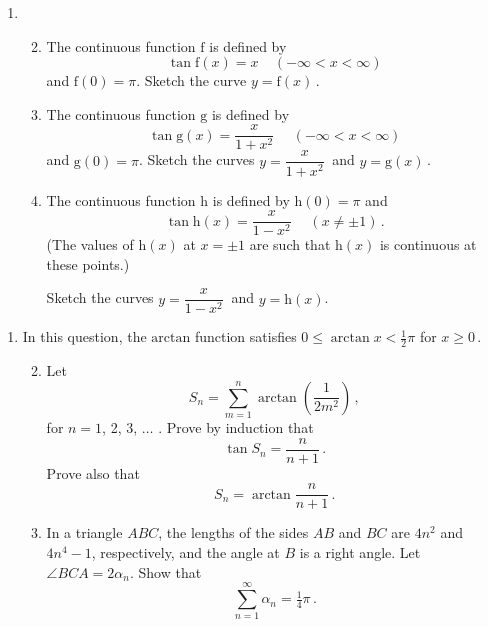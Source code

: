 \documentclass[a4, 11pt]{report}
\newlength{\qspace}
\newcounter{qnumber}
\newenvironment{question}%
 {\vspace{\qspace}
  \begin{enumerate}[\bfseries 1\quad][10]%
    \setcounter{enumi}{\value{qnumber}}%
    \item%
 }
{
  \end{enumerate}
  \filbreak
  \stepcounter{qnumber}
 }
\newenvironment{questionparts}[1][1]%
 {
  \begin{enumerate}[\bfseries (i)]%
    \setcounter{enumii}{#1}
    \addtocounter{enumii}{-1}
    \setlength{\itemsep}{5mm}
    \setlength{\parskip}{8pt}
 }
 {
  \end{enumerate}
 }
\def\g{{\mathrm g}}
\def\h{{\mathrm h}}
\def\f{{\mathrm f}}
\def\le{\leqslant}
\def\ge{\geqslant}
\renewcommand{\.}[1]{\ensuremath{\mathrm{#1}}}
\newcommand{\+}[1]{\ensuremath{\mathbf{#1}}}
\begin{document}
\begin{question}
\begin{questionparts}
\item The continuous function $\f$ is defined by 
\[
\tan \f(x) = x    \ \ \ \ \ (-\infty < x <\infty)
\]
and $\f(0)=\pi$. Sketch the curve $y=\f(x)$\,. 

\item The continuous function $\g$ is defined by 
\[
\tan \g(x) = \frac x {1+x^2} \ \ \ \ \ \  (-\infty < x <\infty)
\]
and $\g(0)=\pi$. Sketch the curves $y=  \dfrac x {1+x^2} \ $ and  $y=\g(x)$\,. 
\item 

The continuous function $\h  $ is defined by $\h  (0)=\pi$ and 
\[
\tan \h  (x)=  \frac x {1-x^2}\,
\ \ \ \ \ (x \ne \pm 1)
\,.
\]
(The values of $\h  (x)$ at $x=\pm1$ are such that $\h  (x)$ is continuous at these points.) 

Sketch the curves $y=  \dfrac x {1-x^2} \ $ and $y=\h  (x)$.













\end{questionparts}
\end{question}

\begin{question}
In this question,  the $\mathrm{arctan}$ function satisfies $0\le \arctan x <\frac12 \pi$ for $x\ge0\,$.

\begin{questionparts}

\item Let 
\[
S_n= \sum_{m=1}^n \arctan \left(\frac1 {2m^2}\right) 
\,,
\]
for $n=1$, 2, 3, $\ldots$ . Prove by induction that
\[
\tan S_n = \frac n {n+1} \,.
\]
Prove also  that
\[
S_n = \arctan  \frac n {n+1} \,.
\]
\item In a triangle $ABC$, the lengths of the sides $AB$ and $BC$ are $4n^2$ and $4n^4-1$, respectively, and the angle at $B$ is a right angle. Let $\angle BCA = 2\alpha_n$. Show that
\[
\sum_{n=1}^\infty \alpha_n = \tfrac14\pi \,.
\]
\end{questionparts}
\end{question}
	
\end{document}
